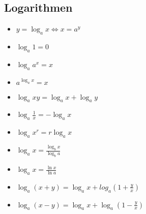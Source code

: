 \subsection{Logarithmen}
\begin{itemize}[leftmargin=*]
  \item $y = \log_a x \Leftrightarrow x = a^y$
  \item $\log_a 1 = 0$
  \item $\log_a a^x = x$
  \item $a^{\log_a x} = x $
  \item $\log_a xy = \log_a x + \log_a y$
  \item $\log_a \frac{1}{x} = - \log_a x$
  \item $\log_a x^r = r \log_a x$
  \item $\log_a x = \frac{\log_b x}{\log_b a}$
  \item $\log_a x = \frac{\ln x}{\ln a}$
  \item $\log_a (x+y) = \log_a x + log_a (1 + \frac{y}{x})$
  \item $\log_a (x-y) = \log_a x + \log_a (1- \frac{y}{x})$
\end{itemize}

